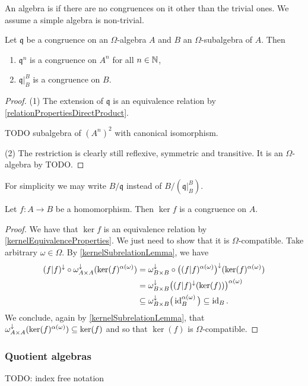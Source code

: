 An algebra is  if there are no congruences on it other than the trivial ones. We assume a simple algebra is non-trivial.

\begin{lemma} \label{basicCongruenceLemma}
Let $\mathfrak{q}$ be a congruence on an $\Omega$-algebra $A$ and $B$ an $\Omega$-subalgebra of $A$. Then
\begin{enumerate}
\item $\mathfrak{q}^n$ is a congruence on $A^n$ for all $n\in \mathbb{N}$,
\item $\mathfrak{q}|_B^B$ is a congruence on $B$.
\end{enumerate}
\end{lemma}
\begin{proof}
(1) The extension of $\mathfrak{q}$ is an equivalence relation by \ref{relationPropertiesDirectProduct}.

TODO subalgebra of $(A^n)^2$ with canonical isomorphism.

(2) The restriction is clearly still reflexive, symmetric and transitive. It is an $\Omega$-algebra by TODO.
\end{proof}
For simplicity we may write $B/\mathfrak{q}$ instead of $B/(\mathfrak{q}|_B^B)$.

\begin{proposition} \label{kernelCongruence}
Let $f:A\to B$ be a homomorphism. Then $\ker f$ is a congruence on $A$.
\end{proposition}
\begin{proof}
We have that $\ker f$ is an equivalence relation by \ref{kernelEquivalenceProperties}. We just need to show that it is $\Omega$-compatible. Take arbitrary $\omega\in \Omega$. By \ref{kernelSubrelationLemma}, we have
\begin{align*}
(f|f)^\downarrow\circ \omega_{A\times A}^\downarrow(\ker(f)^{\alpha(\omega)}) &= \omega_{B\times B}^\downarrow\circ \big((f|f)^{\alpha(\omega)}\big)^\downarrow(\ker(f)^{\alpha(\omega)}) \\
&= \omega_{B\times B}^\downarrow \big((f|f)^\downarrow(\ker(f))\big)^{\alpha(\omega)} \\
&\subseteq \omega_{B\times B}^\downarrow \big(\operatorname{id}_B^{\alpha(\omega)}\big) \subseteq  \operatorname{id}_B.
\end{align*}
We conclude, again by \ref{kernelSubrelationLemma}, that $\omega_{A\times A}^\downarrow(\ker(f)^{\alpha(\omega)})\subseteq \ker(f)$ and so that $\ker(f)$ is $\Omega$-compatible. 
\end{proof}


\subsubsection{Quotient algebras}
TODO: index free notation

